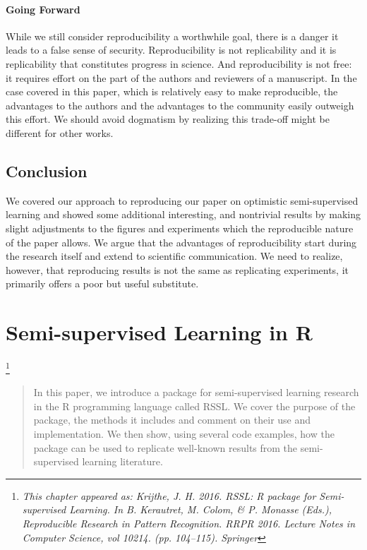 \documentclass[twoside]{memoir}\usepackage[]{graphicx}\usepackage{xcolor}
\newcommand\blfootnote[1]{%
  \begingroup
  \renewcommand\thefootnote{}\footnote{\itshape#1}%
  \addtocounter{footnote}{-1}%
  \endgroup
}
\begin{document}
\subsubsection{Going Forward}
While we still consider reproducibility a worthwhile goal, there is a danger it leads to a false sense of security. Reproducibility is not replicability and it is replicability that constitutes progress in science. And reproducibility is not free: it requires effort on the part of the authors and reviewers of a manuscript. In the case covered in this paper, which is relatively easy to make reproducible, the advantages to the authors and the advantages to the community easily outweigh this effort. We should avoid dogmatism by realizing this trade-off might be different for other works.

\section{Conclusion}
We covered our approach to reproducing our paper on optimistic semi-supervised learning and showed some additional interesting, and nontrivial results by making slight adjustments to the figures and experiments which the reproducible nature of the paper allows. We argue that the advantages of reproducibility start during the research itself and extend to scientific communication. We need to realize, however, that reproducing results is not the same as replicating experiments, it primarily offers a poor but useful substitute.

\chapter{Semi-supervised Learning in R}
\label{chapter:rssl}
\blfootnote{This chapter appeared as: Krijthe, J. H. 2016. RSSL: R package for Semi-supervised Learning. In B. Kerautret, M. Colom, \& P. Monasse (Eds.), Reproducible Research in Pattern Recognition. RRPR 2016. Lecture Notes in Computer Science, vol 10214. (pp. 104–115). Springer}

\begin{abstract}
In this paper, we introduce a package for semi-supervised learning research in the R programming language called RSSL. We cover the purpose of the package, the methods it includes and comment on their use and implementation. We then show, using several code examples, how the package can be used to replicate well-known results from the semi-supervised learning literature.
\end{abstract}
\end{document}
